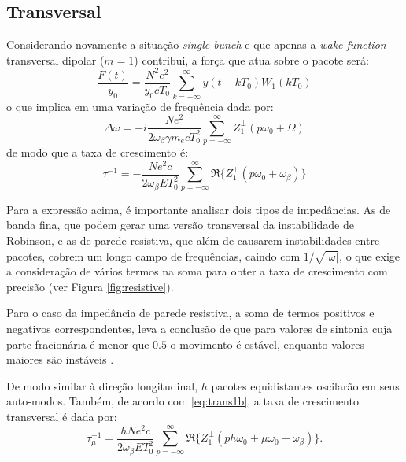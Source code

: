 \subsection{Transversal}

Considerando novamente a situação \textit{single-bunch} e que apenas a \textit{wake function} transversal dipolar ($m=1$) contribui, a força que atua sobre o pacote será:
\begin{equation}\label{eq:trans1b}
 \frac{F(t)}{y_0}=\frac{N^2 e^2}{y_0 c T_0} \sum^\infty_{k=-\infty}
y(t-kT_0)W_1(kT_0)
\end{equation}
o que implica em uma variação de frequência dada por:
\begin{equation}
 \Delta \omega = - i\frac{Ne^2}{2\omega_\beta \gamma m_e c T^2_0}
\sum^\infty_{p=-\infty} Z^\perp_1 (p \omega_0 + \Omega)
\end{equation}
de modo que a taxa de crescimento é:
\begin{equation}\label{resistive}
\tau^{-1} = -\frac{Ne^2 c}{2\omega_\beta E T^2_0} \sum^\infty_{p=-\infty}
\Re\{Z^\perp_ 1 (p \omega_0 + \omega_\beta)\}
\end{equation}

Para a expressão acima, é importante analisar dois tipos de impedâncias. As de banda fina, que podem gerar uma versão transversal da instabilidade de Robinson, e as de parede resistiva, que além de causarem instabilidades entre-pacotes, cobrem um longo campo de frequências, caindo com $1/\sqrt{|\omega|}$, o que exige a consideração de vários termos na soma para obter a taxa de crescimento com precisão (ver Figura \ref{fig:resistive}).


Para o caso da impedância de parede resistiva, a soma de termos positivos e negativos correspondentes, leva a conclusão de que para valores de sintonia cuja parte fracionária é menor que $0.5$ o movimento é estável, enquanto valores maiores são instáveis \cite{Khan}.

De modo similar à direção longitudinal, $h$ pacotes equidistantes oscilarão em seus auto-modos. Também, de acordo com \eqref{eq:trans1b}, a taxa de crescimento transversal é dada por:
\begin{equation}
\tau^{-1}_\mu = \frac{h Ne^2 c}{2\omega_\beta E T^2_0} \sum^\infty_{p=-\infty}
\Re\{Z^\perp_ 1 (p h\omega_0 +\mu\omega_0 + \omega_\beta)\}.
\end{equation}

